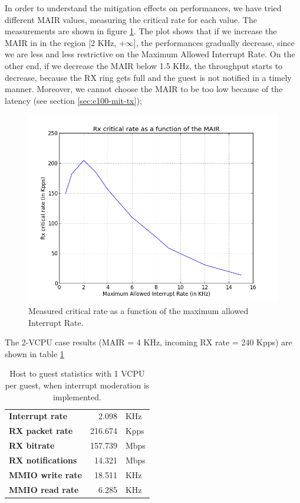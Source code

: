 \vspace{0.5cm}

In order to understand the mitigation effects on performances, we have tried different MAIR values, measuring the critical rate for
each value. The measurements are shown in figure \ref{fig:itr-vs-cr}.
The plot shows that if we increase the MAIR in in the region [2 KHz, $+\infty$], the performances gradually decrease, since we are 
less and less restrictive on the Maximum Allowed Interrupt Rate.
On the other end, if we decrease the MAIR below 1.5 KHz, the throughput starts to decrease, because the RX ring gets full and the guest
is not notified in a timely manner.
Moreover, we cannot choose the MAIR to be too low because of the latency (see section \ref{sec:e100-mit-tx});

\begin{figure}[bt]
\centering
\includegraphics[scale = 0.7]{MAIR-vs-CR.png}
\caption{Measured critical rate as a function of the maximum allowed Interrupt Rate.}
\label{fig:itr-vs-cr}
\end{figure}


\vspace{0.5cm}

The 2-VCPU case results (MAIR = 4 KHz, incoming RX rate = 240 Kpps) are shown in table \ref{tab:e1000-mit-rx-g2h2vcpu}

\begin{table}
\begin{center}
\begin{tabular}{lrl}
\toprule
\textbf{Interrupt rate} & 2.098 & KHz\\
\textbf{RX packet rate} & 216.674 & Kpps\\
\textbf{RX bitrate} & 157.739 & Mbps\\
\textbf{RX notifications} & 14.321 & Mbps\\
\textbf{MMIO write rate} & 18.511 & KHz\\
\textbf{MMIO read rate} & 6.285 & KHz\\
\bottomrule
\end{tabular}
\end{center}
\caption{Host to guest statistics with 1 VCPU per guest, when interrupt moderation is implemented.}
\label{tab:e1000-mit-rx-g2h2vcpu}
\end{table}

